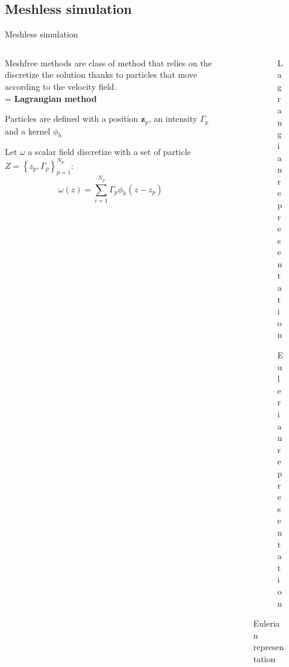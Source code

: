 \documentclass[aspectratio=169]{beamer} %
\begin{document}
\subsection{Meshless simulation}
\begin{frame}{Meshless simulation}
    \small
    \begin{columns}
        \begin{column}{0.5\textwidth}
            \begin{Definition}
                Meshfree methods are class of method that relies on the discretize the solution thanks to particles that move according to the velocity field. \\
                = \textbf{Lagrangian method}
            \end{Definition}

            Particles are defined with a position $\bm z_p$, an intensity $\Gamma_p$ and a kernel $\phi_h$

            Let $\omega$ a scalar field discretize with a set of particle $Z = \left\{z_p, \Gamma_p\right\}_{p=1}^{N_p}$:
            \begin{equation*}
                \omega (z) = \sum_{i=1}^{N_p} \Gamma_p \phi_h(z - z_p)
            \end{equation*}
        \end{column}
        \begin{column}{0.5\textwidth}

            \begin{figure}
                \centering
                \begin{subfigure}[t]{\textwidth}
                    \centering
                    \caption{Lagrangian representation}
                \end{subfigure}
                \vfill
                \begin{subfigure}[b]{\textwidth}
                    \centering
                    \caption{Eulerian representation}
                \end{subfigure}
            \end{figure}
        \end{column}
    \end{columns}

\end{frame}
\end{document}
